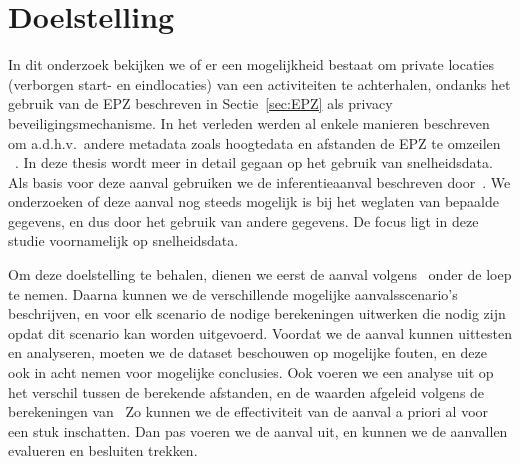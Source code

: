 \section{Doelstelling}
In dit onderzoek bekijken we of er een mogelijkheid bestaat om private locaties
(verborgen start- en eindlocaties) van een activiteiten te achterhalen, ondanks
het gebruik van de \ac{EPZ} beschreven in Sectie~\ref{sec:EPZ} als privacy
beveiligingsmechanisme. In het verleden werden al enkele manieren beschreven om
a.d.h.v.\ andere metadata zoals hoogtedata en afstanden de \ac{EPZ} te omzeilen
~\cite{Verdonck_2022, Dhondt, sec18has3:online}. In deze thesis wordt meer in
detail gegaan op het gebruik van snelheidsdata. Als basis voor deze aanval
gebruiken we de inferentieaanval beschreven door~\citeauthor{Dhondt}. We
onderzoeken of deze aanval nog steeds mogelijk is bij het weglaten van bepaalde
gegevens, en dus door het gebruik van andere gegevens. De focus ligt in deze
studie voornamelijk op snelheidsdata.

Om deze doelstelling te behalen, dienen we eerst de aanval
volgens~\citeauthor{Dhondt} onder de loep te nemen. Daarna kunnen we de
verschillende mogelijke aanvalsscenario's beschrijven, en voor elk scenario de
nodige berekeningen uitwerken die nodig zijn opdat dit scenario kan worden
uitgevoerd. Voordat we de aanval kunnen uittesten en analyseren, moeten we de
dataset beschouwen op mogelijke fouten, en deze ook in acht nemen voor
mogelijke conclusies. Ook voeren we een analyse uit op het verschil tussen de
berekende afstanden, en de waarden afgeleid volgens de berekeningen
van~\citeauthor{Dhondt} Zo kunnen we de effectiviteit van de aanval a priori al
voor een stuk inschatten. Dan pas voeren we de aanval uit, en kunnen we de
aanvallen evalueren en besluiten trekken.

